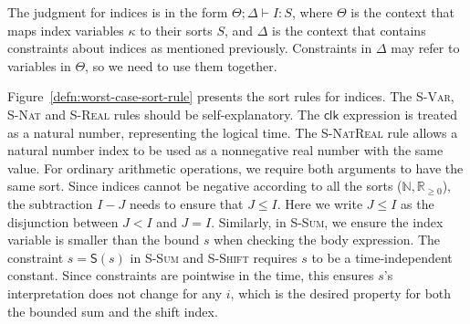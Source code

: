 The judgment for indices is in the form $\Theta;\Delta\vdash I: S$, where $\Theta$ is the context that maps index variables $\kappa$ to their sorts $S$, and 
$\Delta$ is the context that contains constraints about indices as mentioned previously. Constraints in $\Delta$ may refer to variables in $\Theta$, so we need to use them together.

Figure~\ref{defn:worst-case-sort-rule} presents the sort rules for indices. The \textsc{S-Var, S-Nat}  and \textsc{S-Real} rules should be self-explanatory. 
The $\mathsf{clk}$ expression is treated as a natural number, representing the logical time. The \textsc{S-NatReal} rule allows a natural number index to be used as a nonnegative real number with the same value. 
For ordinary arithmetic operations, we require
both arguments to have the same sort. Since indices cannot be negative according to all the sorts ($\mathbb{N}, \mathbb{R}_{\ge0}$), the subtraction $I - J$ needs to
ensure that $J \leq I$. Here we write $J \leq I$ as the disjunction between $J < I$ and $J = I$. Similarly, in \textsc{S-Sum}, we ensure the index variable is smaller than the bound $s$ when checking 
the body expression. The constraint $s = \mathsf{S}(s)$ in \textsc{S-Sum} and \textsc{S-Shift} requires $s$ to be a time-independent constant.
Since constraints are pointwise in the time, this ensures $s$'s interpretation does not change for any $i$, which is the desired property for 
both the bounded sum and the shift index.


